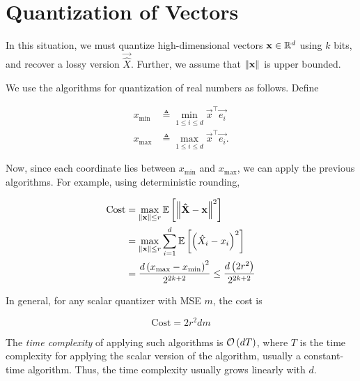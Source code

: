 \documentclass[twoside]{article}
\begin{document}



\section{Quantization of Vectors}

In this situation, we must quantize high-dimensional vectors \(\boldsymbol{\mathbf{x}}\in\mathbb R^d\) using \(k\) bits, and recover a lossy version \(\vec{\hat{X}}\). Further, we assume that \(\left\lVert\boldsymbol{\mathbf{x}}\right\rVert\) is upper bounded.

We use the algorithms for quantization of real numbers as follows. Define

\begin{align}
    x_{\mathrm{min}} &\triangleq \min_{1\le i\le d}\vec{x}^\top\vec{e_i} \\
    x_{\mathrm{max}} &\triangleq \max_{1\le i\le d}\vec{x}^\top\vec{e_i}.
    \label{eq:x-min-max-def}
\end{align}

Now, since each coordinate lies between \(x_{\mathrm{min}}\) and \(x_{\mathrm{max}}\), we can apply the previous algorithms. For example, using deterministic rounding,

\begin{align}
    \mathrm{Cost} &= \max_{\left\lVert\boldsymbol{\mathbf{x}}\right\rVert \le r} \mathbb{E}\left[ \left\lVert\boldsymbol{\mathbf{\hat{X}}}-\boldsymbol{\mathbf{x}}\right\rVert^2 \right] \\
                  &= \max_{\left\lVert\boldsymbol{\mathbf{x}}\right\rVert \le r} \sum_{i=1}^d\mathbb{E}\left[ \left(\hat{X}_i-x_i\right)^2 \right] \\
                  &= \frac{d\left(x_{\mathrm{max}}-x_{\mathrm{min}}\right)^2}{2^{2k+2}} \le \frac{d\left(2r^2\right)}{2^{2k+2}}
                      \label{eq:det-cost}
\end{align}

In general, for any scalar quantizer with MSE \(m\), the cost is

\begin{equation}
    \mathrm{Cost} = 2r^2dm
    \label{eq:cost-scalar}
\end{equation}

The \emph{time complexity} of applying such algorithms is \(\mathcal O\left(dT\right)\), where \(T\) is the time complexity for applying the scalar version of the algorithm, usually a constant-time algorithm. Thus, the time complexity usually grows linearly with \(d\).
\end{document}
